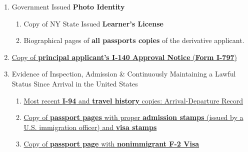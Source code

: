 \begin{enumerate}[label=\textbf{ Exhibit-\arabic*},start=15]
    
   

 
     \item {Government Issued \textbf{Photo Identity}}\begin{enumerate}[label=\roman*.]
        \item Copy of NY State Issued \textbf{Learner's License}
        \item Biographical pages of \textbf{all passports copies} of the derivative applicant.
    \end{enumerate}
    
    \item \hyperref[exhibit1]{Copy of \textbf{principal applicant's I-140 Approval Notice} (\textbf{Form I-797})}
    
    
    \item Evidence of Inspection, Admission \& Continuously Maintaining a Lawful Status Since Arrival in the United States
    \begin{enumerate}[label=\roman*.]
        \item \hyperref[exhibit6c]{Most recent \textbf{I-94} and \textbf{travel history} copies: Arrival-Departure Record}
        \item \hyperref[exhibit6a]{Copy of \textbf{passport pages} with proper \textbf{admission stamps} (issued by a U.S. immigration officer) and \textbf{visa stamps} }
        \item \hyperref[exhibit6b]{Copy of \textbf{passport page} with \textbf{nonimmigrant F-2 Visa}}
        
        

\end{enumerate}
\end{enumerate}
